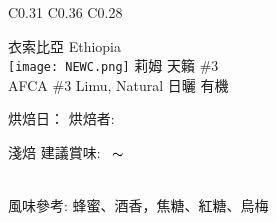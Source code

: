\documentclass[10pt,a4paper]{article}
\begin{document}
\begin{tabular}{C{0.31\textwidth} C{0.36\textwidth} C{0.28\textwidth}}
{\hspace*{1.3cm} { \vspace*{-0.68cm}\Large 
衣索比亞  %
\large
Ethiopia %
}\\
{ \hspace*{-0.66cm}\texttt{[image: NEWC.png]}%
\Large \hspace*{0.1em} \vspace*{0.15cm}  
\hspace*{0.3em}莉姆 天籟 \#3%
}\vspace*{-0.05em}\\
{\normalsize
AFCA \#3 Limu,   Natural \normalsize 日曬 有機 %
}\vspace*{0.25em}\\
\setdatetoday \addtocounter{datenumber}{
-1%
}\setdatebynumber{\thedatenumber}
{\scriptsize 烘焙日：{\scriptsize\datedate}\hspace{0.3em}%
烘焙者: \textbf{\scriptsize{}}}\vspace*{-0.3em}\\
 \addtocounter{datenumber}{
6 }%
\setdatebynumber{\thedatenumber} 
{\normalsize 
淺焙%
\enskip \scriptsize 建議賞味:} \scriptsize{\datemonthname ~\thedateday}$\thicksim$\addtocounter{datenumber}{55}\setdatebynumber{\thedatenumber} \datedate
\\\scriptsize 風味參考: 蜂蜜、酒香，焦糖、紅糖、烏梅
}
\end{tabular}
\end{document}
